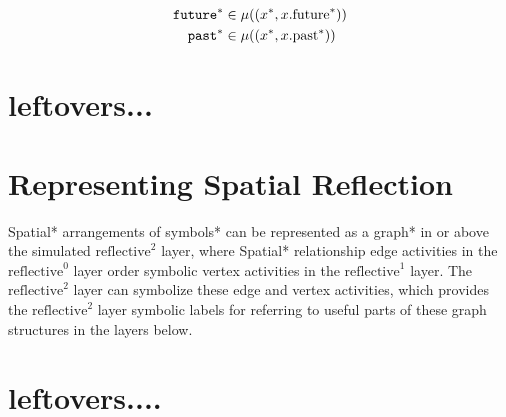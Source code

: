 \begin{align}
\text{\tt{future}}^* &\in \mu((x^*, x.\text{future}^*)) \\
  \text{\tt{past}}^* &\in \mu((x^*, x.\text{past}^*)) 
\end{align}










\section{leftovers...}

\section{Representing Spatial Reflection}

Spatial* arrangements of symbols* can be represented as a graph* in or
above the simulated $\text{reflective}^2$ layer, where Spatial*
relationship edge activities in the $\text{reflective}^0$ layer order
symbolic vertex activities in the $\text{reflective}^1$ layer.  The
$\text{reflective}^2$ layer can symbolize these edge and vertex
activities, which provides the $\text{reflective}^2$ layer symbolic
labels for referring to useful parts of these graph structures in the
layers below.

 \noindent










\section{leftovers....}

